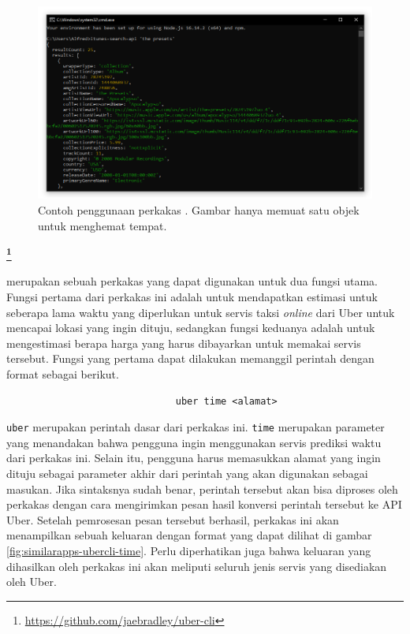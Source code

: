 \documentclass[a4paper,twoside]{article}
\begin{document}
\begin{enumerate}
\begin{figure}[ht]
    \centering
    \includegraphics[width=0.75\linewidth]{itunesapi}
    \caption[Contoh penggunaan perkakas \itunesapi]{Contoh penggunaan perkakas \itunesapi. Gambar hanya memuat satu objek untuk menghemat tempat.}
    \label{fig:similarapps-itunesapi}
\end{figure}

\large{\textbf{\ubercli\footnote{\href{https://github.com/jaebradley/uber-cli}{https://github.com/jaebradley/uber-cli}}}}
\label{sec:similarapps-ubercli}

\ubercli merupakan sebuah perkakas \cl yang dapat digunakan untuk dua fungsi utama. Fungsi pertama dari perkakas ini adalah untuk mendapatkan estimasi untuk seberapa lama waktu yang diperlukan untuk servis taksi \textit{online} dari Uber untuk mencapai lokasi yang ingin dituju, sedangkan fungsi keduanya adalah untuk mengestimasi berapa harga yang harus dibayarkan untuk memakai servis tersebut. 
\newline\newline\noindent
Fungsi yang pertama dapat dilakukan memanggil perintah dengan format sebagai berikut.

\begin{verbatim}
                              uber time <alamat>
\end{verbatim}

\verb|uber| merupakan perintah dasar dari perkakas ini. \verb|time| merupakan parameter yang menandakan bahwa pengguna ingin menggunakan servis prediksi waktu dari perkakas ini. Selain itu, pengguna harus memasukkan alamat yang ingin dituju sebagai parameter akhir dari perintah yang akan digunakan sebagai masukan. Jika sintaksnya sudah benar, perintah tersebut akan bisa diproses oleh perkakas dengan cara mengirimkan pesan hasil konversi perintah tersebut ke API Uber. Setelah pemrosesan pesan tersebut berhasil, perkakas ini akan menampilkan sebuah keluaran dengan format yang dapat dilihat di gambar \ref{fig:similarapps-ubercli-time}. Perlu diperhatikan juga bahwa keluaran yang dihasilkan oleh perkakas ini akan meliputi seluruh jenis servis yang disediakan oleh Uber.


\end{enumerate}
\end{document}
